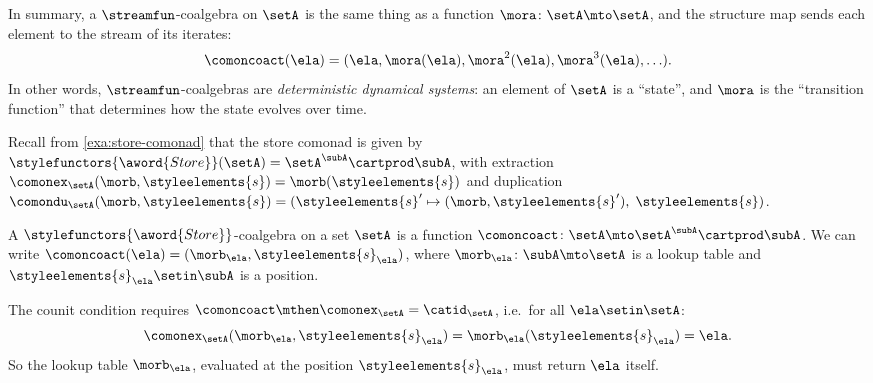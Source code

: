 \begin{example}
In summary, a $\streamfun$-coalgebra on $\setA$ is the same thing as a function $\mora \colon \setA \mto \setA$, and the structure map sends each element to the stream of its iterates:
\begin{equation*}
    \comoncoact(\ela) = (\ela, \mora(\ela), \mora^2(\ela), \mora^3(\ela), \ldots).
\end{equation*}
In other words, $\streamfun$-coalgebras are \emph{deterministic dynamical systems}: an element of $\setA$ is a ``state'', and $\mora$ is the ``transition function'' that determines how the state evolves over time.
\end{example}


\begin{example}
\label{exa:coalgebra-store-comonad}

Recall from \cref{exa:store-comonad} that the store comonad is given by $\stylefunctors{\aword{Store}}(\setA) = \setA^{\subA} \cartprod \subA$, with extraction $\comonex_\setA(\morb, \styleelements{s}) = \morb(\styleelements{s})$ and duplication $\comondu_\setA(\morb, \styleelements{s}) = (\styleelements{s}' \mapsto (\morb, \styleelements{s}'),\; \styleelements{s})$.

A $\stylefunctors{\aword{Store}}$-coalgebra on a set $\setA$ is a function $\comoncoact \colon \setA \mto \setA^{\subA} \cartprod \subA$. We can write $\comoncoact(\ela) = (\morb_\ela, \styleelements{s}_\ela)$, where $\morb_\ela \colon \subA \mto \setA$ is a lookup table and $\styleelements{s}_\ela \setin \subA$ is a position.

The counit condition requires $\comoncoact \mthen \comonex_\setA = \catid_\setA$, i.e.\ for all $\ela \setin \setA$:
\begin{equation*}
    \comonex_\setA(\morb_\ela, \styleelements{s}_\ela) = \morb_\ela(\styleelements{s}_\ela) = \ela.
\end{equation*}
So the lookup table $\morb_\ela$, evaluated at the position $\styleelements{s}_\ela$, must return $\ela$ itself.


\end{example}
